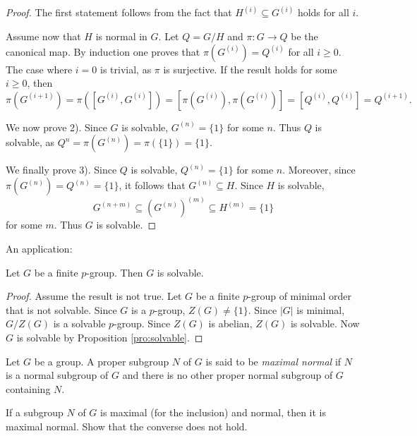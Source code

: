 \begin{proof}
    The first statement follows from the fact that
    $H^{(i)}\subseteq G^{(i)}$ holds for all $i$. 
 
    Assume now that $H$ is normal in $G$. 
    Let $Q=G/H$ and $\pi\colon G\to Q$ be the canonical map.
    By induction one proves that $\pi(G^{(i)})=Q^{(i)}$ for all $i\geq0$.
    The case where $i=0$ is trivial, as $\pi$ is surjective. 
    If the result holds for some $i\geq0$, then
    \[
            \pi(G^{(i+1)})=\pi([G^{(i)},G^{(i)}])=[\pi(G^{(i)}),\pi(G^{(i)})]=[Q^{(i)},Q^{(i)}]=Q^{(i+1)}.
    \]

    We now prove 2). Since $G$ is solvable, $G^{(n)}=\{1\}$ for some $n$. 
    Thus $Q$ is solvable, as $Q^{n}=\pi(G^{(n)})=\pi(\{1\})=\{1\}$. 

    We finally prove 3). 
    Since $Q$ is solvable, $Q^{(n)}=\{1\}$ for some $n$.
    Moreover, since $\pi(G^{(n)})=Q^{(n)}=\{1\}$, it follows that
    $G^{(n)}\subseteq H$. Since $H$
    is solvable, 
    \[
        G^{(n+m)}\subseteq (G^{(n)})^{(m)}\subseteq H^{(m)}=\{1\}
    \]
    for some $m$. Thus $G$ is solvable.
\end{proof}

An application:

\begin{proposition}
    Let $G$ be a finite $p$-group. Then $G$ is solvable. 
\end{proposition}

\begin{proof}
    Assume the result is not true. Let $G$ be a finite
    $p$-group of minimal order that is not solvable. Since 
    $G$ is a $p$-group, $Z(G)\ne\{1\}$. Since $|G|$ is minimal, 
    $G/Z(G)$ is a solvable $p$-group. Since $Z(G)$ is abelian, 
    $Z(G)$ is solvable. Now $G$ is solvable 
    by Proposition \ref{pro:solvable}.
\end{proof}

Let $G$ be a group. A proper subgroup $N$ of $G$ is said to be \emph{maximal normal} 
if $N$ is a normal subgroup of $G$ and there is no other proper normal subgroup of $G$ 
containing $N$. 

\begin{exercise}
    If a subgroup $N$ of $G$ is maximal (for the inclusion) and
    normal, then it is maximal normal. Show that the converse does not hold.
\end{exercise}


